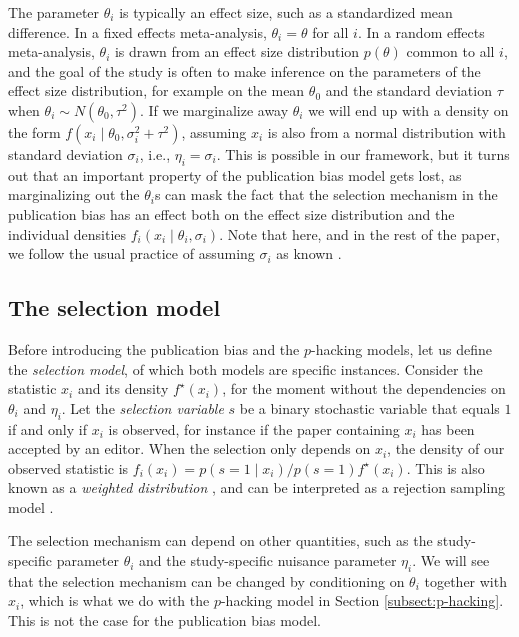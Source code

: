 \documentclass[useAMS,usenatbib,referee]{biom}
\begin{document}
The parameter $\theta_{i}$ is typically an effect size, such as a standardized mean difference. In a fixed effects meta-analysis, $\theta_{i}=\theta$ for all $i$. In a random effects meta-analysis, $\theta_{i}$ is drawn from an effect size distribution $p(\theta)$ common to all $i$, and the goal of the study is often to make inference on the parameters of the effect size distribution, for example on the mean $\theta_{0}$ and the standard deviation $\tau$ when $\theta_i \sim N(\theta_{0},\tau^2)$. If we marginalize away $\theta_{i}$ we will end up with a density on the form $f(x_{i}\mid \theta_{0},\sigma_{i}^{2}+\tau^{2})$, assuming $x_{i}$ is also from a normal distribution with standard deviation $\sigma_{i}$, i.e., $\eta_i = \sigma_i$. This is possible in our framework, but it turns out that an important property of the publication bias model gets lost, as marginalizing out the $\theta_{i}$s can mask the fact that the selection mechanism in the publication bias has an effect both on the effect size distribution and the individual densities $f_{i}(x_{i}\mid\theta_i, \sigma_i)$. Note that here, and in the rest of the paper, we follow the usual practice of assuming $\sigma_i$ as known \citep{vanHouwelingen2002}.

\subsection{The selection model}\label{subsec:selectionModel}
Before introducing the publication bias and the $p$-hacking models, let us define the \emph{selection model}, of which both models are specific instances. Consider the statistic $x_i$ and its density $f^{\star}(x_{i})$, for the moment without the dependencies on $\theta_{i}$ and $\eta_{i}$. Let the \emph{selection variable} $s$ be a binary stochastic variable that equals $1$ if and only if $x_i$ is observed, for instance if the paper containing $x_i$ has been accepted by an editor. When the selection only depends on $x_i$, the density of our observed statistic is $f_{i}(x_{i}) = p(s=1\mid x_i)/p(s=1)f^{\star}(x_{i})$. This is also known as a \emph{weighted distribution} \citep[][eq. 3.1]{rao1985weighted}, and can be interpreted as a rejection sampling model \citep{von1951various}.

The selection mechanism can depend on other quantities, such as the study-specific parameter $\theta_i$ and the study-specific nuisance parameter $\eta_{i}$. We will see that the selection mechanism can be changed by conditioning on $\theta_i$ together with $x_i$, which is what we do with the $p$-hacking model in Section \ref{subsect:p-hacking}. This is not the case for the publication bias model.
\end{document}
